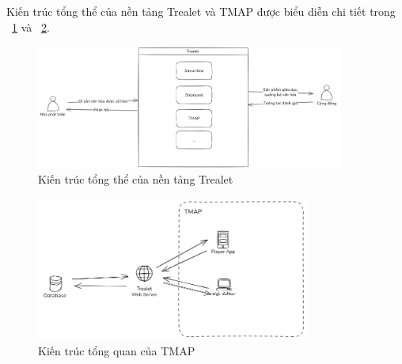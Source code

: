 Kiến trúc tổng thể của nền tảng Trealet và TMAP được biểu diễn chi tiết trong \figurename~\ref{fig:KientrucTrealet} và \figurename~\ref{fig:KienTrucTMAP}.

\begin{figure}[h]
    \centering
    \includegraphics[width=0.9\textwidth]{Hinh_Kien_Truc_Trealet.png} %
    \caption{Kiến trúc tổng thể của nền tảng Trealet}
    \label{fig:KientrucTrealet}
\end{figure}

\begin{figure}[h]
    \centering
    \includegraphics[width=0.8\textwidth]{tmap_design.png} %
    \caption{Kiến trúc tổng quan của TMAP}
    \label{fig:KienTrucTMAP}
\end{figure}